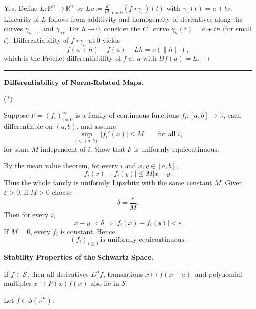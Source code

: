 \begin{solution}
Yes. Define $L:\mathbb{R}^n\to\mathbb{R}^n$ by $Lv:=\frac{d}{dt}\big|_{t=0}(f\circ\gamma_v)(t)$ with
$\gamma_v(t)=a+tv$. Linearity of $L$ follows from additivity and homogeneity of derivatives along
the curves $\gamma_{u+v}$ and $\gamma_{\alpha v}$.
For $h\to0$, consider the $C^1$ curve $\gamma_h(t)=a+th$ (for small $t$). Differentiability of
$f\circ\gamma_h$ at $0$ yields
\[
f(a+h)-f(a)-Lh=o(\|h\|),
\]
which is the Fr\'echet differentiability of $f$ at $a$ with $Df(a)=L$.
\hfill$\Box$

\bigskip\hrule\bigskip
\end{solution}

\begin{problem}[CP-II-0280]
\label{prob:cp-ii-0280}
\textbf{Differentiability of Norm-Related Maps.}

\hspace*{1.5em}(*)

Suppose $F=(f_i)_{i=0}^\infty$ is a family of continuous functions $f_i:[a,b]\to\mathbb{R}$,
each differentiable on $(a,b)$, and assume
\[
\sup_{x\in(a,b)}|f_i'(x)|\le M\qquad\text{for all }i,
\]
for some $M$ independent of $i$. Show that $F$ is uniformly equicontinuous.
\end{problem}

\begin{solution}
By the mean value theorem, for every \(i\) and \(x,y\in[a,b]\),
\[
|f_i(x)-f_i(y)|\le M|x-y|.
\]
Thus the whole family is uniformly Lipschitz with the same constant \(M\). Given
\(\varepsilon>0\), if \(M>0\) choose
\[
\delta=\frac{\varepsilon}{M}.
\]
Then for every \(i\),
\[
|x-y|<\delta\Longrightarrow |f_i(x)-f_i(y)|<\varepsilon.
\]
If \(M=0\), every \(f_i\) is constant. Hence
\[
\boxed{(f_i)_{i\ge0}\text{ is uniformly equicontinuous}.}
\]
\end{solution}

\begin{problem}[CP-II-0298]
\label{prob:cp-ii-0298}
\textbf{Stability Properties of the Schwartz Space.}

\hspace*{1.5em}If $f\in\mathcal{S}$, then all derivatives $D^\alpha f$,
	translations $x\mapsto f(x-a)$, and polynomial multiples
	$x\mapsto P(x)f(x)$ also lie in $\mathcal{S}$.

Let $f\in\mathcal{S}(\mathbb{R}^n)$.
\end{problem}

